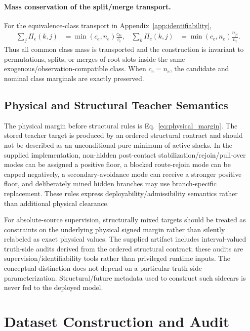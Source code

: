 \documentclass{article} %
\begin{document}
\paragraph{Mass conservation of the split/merge transport.}
For the equivalence-class transport in Appendix~\ref{app:identifiability},
\begin{align}
 \sum_j\Pi_e(k,j)&=\min(c_e,n_e)\frac{c_{ke}}{c_e}, &
 \sum_k\Pi_e(k,j)&=\min(c_e,n_e)\frac{n_{je}}{n_e}.
\end{align}
Thus all common class mass is transported and the construction is invariant to permutations, splits, or merges of root slots inside the same exogenous/observation-compatible class. When $c_e=n_e$, the candidate and nominal class marginals are exactly preserved.

\subsection{Physical and Structural Teacher Semantics}
\label{app:teacher_contract}
The physical margin before structural rules is Eq.~\eqref{eq:physical_margin}. The stored teacher target is produced by an ordered structural contract and should not be described as an unconditional pure minimum of active slacks. In the supplied implementation, non-hidden post-contact stabilization/rejoin/pull-over modes can be assigned a positive floor, a blocked route-rejoin mode can be capped negatively, a secondary-avoidance mode can receive a stronger positive floor, and deliberately mined hidden branches may use branch-specific replacement. These rules express deployability/admissibility semantics rather than additional physical clearance.

For absolute-source supervision, structurally mixed targets should be treated as constraints on the underlying physical signed margin rather than silently relabeled as exact physical values. The supplied artifact includes interval-valued truth-side audits derived from the ordered structural contract; these audits are supervision/identifiability tools rather than privileged runtime inputs. The conceptual distinction does not depend on a particular truth-side parameterization. Structural/future metadata used to construct such sidecars is never fed to the deployed model.

\section{Dataset Construction and Audit}
\label{app:data}
\end{document}
